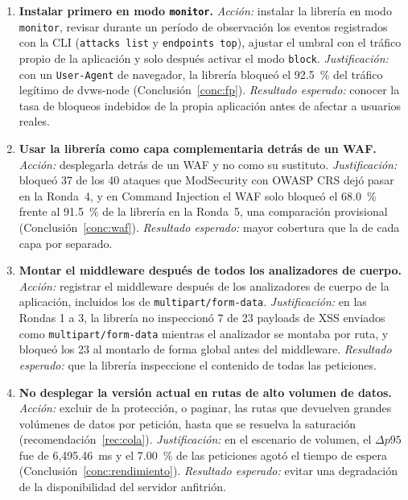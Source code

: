 \begin{enumerate}
    \item \textbf{Instalar primero en modo \texttt{monitor}.} \textit{Acción:} instalar la librería
    en modo \texttt{monitor}, revisar durante un período de observación los eventos registrados con
    la CLI (\texttt{attacks list} y \texttt{endpoints top}), ajustar el umbral con el tráfico propio
    de la aplicación y solo después activar el modo \texttt{block}. \textit{Justificación:} con un
    \texttt{User-Agent} de navegador, la librería bloqueó el 92.5~\% del tráfico legítimo de
    dvws-node (Conclusión~\ref{conc:fp}). \textit{Resultado esperado:} conocer la tasa de bloqueos
    indebidos de la propia aplicación antes de afectar a usuarios reales.

    \item \textbf{Usar la librería como capa complementaria detrás de un WAF.}
    \textit{Acción:} desplegarla detrás de un WAF y no como su sustituto. \textit{Justificación:}
    bloqueó 37 de los 40 ataques que ModSecurity con OWASP CRS dejó pasar en la Ronda~4, y en
    Command Injection el WAF solo bloqueó el 68.0~\% frente al 91.5~\% de la librería en la
    Ronda~5, una comparación provisional (Conclusión~\ref{conc:waf}). \textit{Resultado esperado:}
    mayor cobertura que la de cada capa por separado.

    \item \textbf{Montar el middleware después de todos los analizadores de cuerpo.}
    \textit{Acción:} registrar el middleware después de los analizadores de cuerpo de la aplicación,
    incluidos los de \texttt{multipart/form-data}. \textit{Justificación:} en las Rondas 1 a 3, la
    librería no inspeccionó 7 de 23 payloads de XSS enviados como \texttt{multipart/form-data}
    mientras el analizador se montaba por ruta, y bloqueó los 23 al montarlo de forma global antes
    del middleware. \textit{Resultado esperado:} que la librería inspeccione el contenido de todas
    las peticiones.

    \item \textbf{No desplegar la versión actual en rutas de alto volumen de datos.}
    \textit{Acción:} excluir de la protección, o paginar, las rutas que devuelven grandes volúmenes
    de datos por petición, hasta que se resuelva la saturación (recomendación~\ref{rec:cola}).
    \textit{Justificación:} en el escenario de volumen, el $\Delta p95$ fue de 6{,}495.46~ms y el
    7.00~\% de las peticiones agotó el tiempo de espera (Conclusión~\ref{conc:rendimiento}).
    \textit{Resultado esperado:} evitar una degradación de la disponibilidad del servidor anfitrión.
\end{enumerate}

